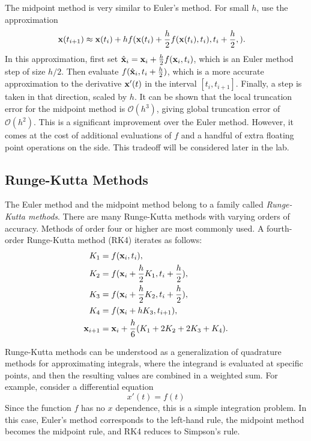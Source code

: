 The midpoint method is very similar to Euler's method.
For small $h$, use the approximation
\begin{align*}
\mathbf{x}(t_{i+1}) &\approx  \mathbf{x}(t_{i}) + h f(\mathbf{x}(t_{i})+\frac{h}{2} f(\mathbf{x}(t_i),t_i),t_{i}+\frac{h}{2},).
\end{align*}
In this approximation, first set $\hat {\mathbf{x}}_i = \mathbf{x}_i+\frac{h}{2}f(\mathbf{x}_i,t_i)$, which is an Euler method step of size $h/2$.
Then evaluate $f(\hat {\mathbf{x}}_i,t_i+\frac{h}{2})$, which is a more accurate approximation to the derivative $\mathbf{x}'(t)$ in the interval $[t_i,t_{i+1}]$.
Finally, a step is taken in that direction, scaled by $h$.
It can be shown that the local truncation error for the midpoint method is $\mathcal{O}(h^3)$, giving global truncation error of $\mathcal{O}(h^2)$.
This is a significant improvement over the Euler method.
However, it comes at the cost of additional evaluations of $f$ and a handful of extra floating point operations on the side.
This tradeoff will be considered later in the lab.

\subsection*{Runge-Kutta Methods}
The Euler method and the midpoint method belong to a family called \textit{Runge-Kutta methods}.
There are many Runge-Kutta methods with varying orders of accuracy.
Methods of order four or higher are most commonly used.
A fourth-order Runge-Kutta method (RK4) iterates as follows: 
\begin{align*}
	\begin{split}
K_1 &= f(\mathbf{x}_i,t_i), \\
K_2 &= f(\mathbf{x}_i + \frac{h}{2} K_1,t_i + \frac{h}{2}),\\
K_3 &= f(\mathbf{x}_i + \frac{h}{2} K_2,t_i + \frac{h}{2}),\\
K_4 &= f(\mathbf{x}_i + h K_3,t_{i+1}),\\
\mathbf{x}_{i+1} &= \mathbf{x}_i + \frac{h}{6}(K_1 + 2K_2 + 2K_3 + K_4).
	\end{split}
\end{align*}

Runge-Kutta methods can be understood as a generalization of quadrature methods for approximating integrals, where the integrand is evaluated at specific points, and then the resulting values are combined in a weighted sum.
For example, consider a differential equation 
$$x'(t) = f(t)$$
Since the function $f$ has no $x$ dependence, this is a simple integration problem.
In this case, Euler's method corresponds to the left-hand rule, the midpoint method becomes the midpoint rule, and RK4 reduces to Simpson's rule.

